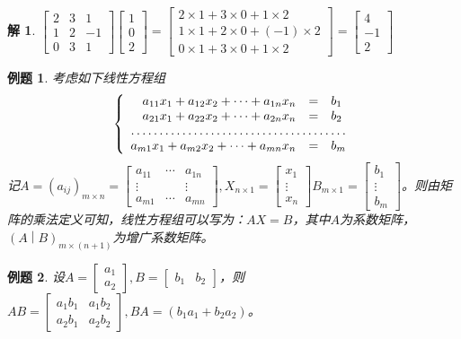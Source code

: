 \documentclass[a4paper]{book}
\newtheorem{eg}{例题}[chapter]
\newtheorem*{solution}{解}
\begin{document}
\begin{solution}
$\begin{bmatrix} 2 & 3 & 1 \\ 1 & 2 & -1 \\ 0 & 3 & 1\end{bmatrix} \begin{bmatrix} 1 \\ 0 \\ 2 \end{bmatrix} = \begin{bmatrix} 2\times 1 + 3\times 0 + 1\times 2 \\ 1\times 1 + 2\times 0 + (-1)\times 2 \\ 0\times 1 + 3\times 0 + 1\times 2\end{bmatrix} = \begin{bmatrix} 4 \\ -1 \\ 2 \end{bmatrix}$
\end{solution}

\begin{eg}
考虑如下线性方程组
$$\left\{ \begin{array}{rcl} a_{11}x_1 + a_{12}x_2 + \cdots + a_{1n}x_n & = & b_1 \\ a_{21}x_1 + a_{22}x_2 + \cdots + a_{2n}x_n & = & b_2 \\ \hdotsfor{3} \\ a_{m1}x_1 + a_{m2}x_2 + \cdots + a_{mn}x_n & = & b_m \end{array}\right.$$
记$A = (a_{ij})_{m\times n} = \begin{bmatrix} a_{11} & \cdots & a_{1n} \\ \vdots & & \vdots \\ a_{m1} & \cdots & a_{mn} \end{bmatrix}, X_{n\times 1} = \begin{bmatrix} x_1 \\ \vdots \\ x_n \end{bmatrix} B_{m\times 1} = \begin{bmatrix} b_1 \\ \vdots \\ b_m \end{bmatrix}$。则由矩阵的乘法定义可知，线性方程组可以写为：$AX = B$，其中$A$为系数矩阵，$\left( A \middle| B \right)_{m\times(n+1)}$为增广系数矩阵。
\end{eg}

\begin{eg}
设$A = \begin{bmatrix} a_1 \\ a_2 \end{bmatrix}, B = \begin{bmatrix} b_1 & b_2 \end{bmatrix}$，则$AB = \begin{bmatrix} a_1b_1 & a_1b_2 \\ a_2b_1 & a_2b_2 \end{bmatrix}, BA = (b_1a_1 + b_2a_2)$。
\end{eg}
\end{document}
